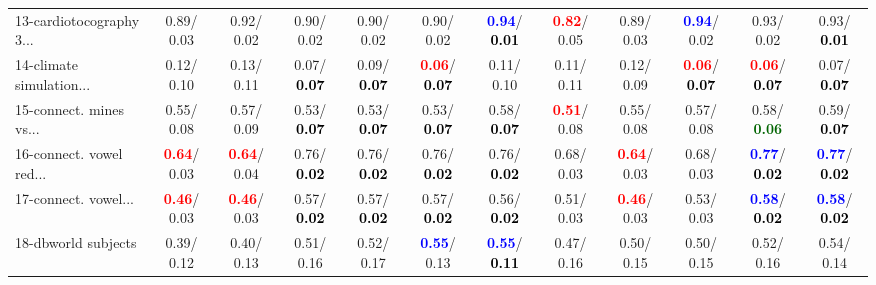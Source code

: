 \begin{table}[h]
\begin{center}
{\begin{tabular}{lc|c|c|c|c|c|c|c|c|c|c}
13-cardiotocography 3... &   0.89/  0.03 &   0.92/  0.02 &   0.90/  0.02 &   0.90/  0.02 &   0.90/  0.02 & \textcolor{blue}{\textbf{  0.94}}/\textcolor{black}{\textbf{  0.01}} & \textcolor{red}{\textbf{  0.82}}/  0.05 &   0.89/  0.03 & \textcolor{blue}{\textbf{  0.94}}/  0.02 &   0.93/  0.02 &   0.93/\textcolor{black}{\textbf{  0.01}} \\
14-climate simulation... &   0.12/  0.10 &   0.13/  0.11 &   0.07/\textcolor{black}{\textbf{  0.07}} &   0.09/\textcolor{black}{\textbf{  0.07}} & \textcolor{red}{\textbf{  0.06}}/\textcolor{black}{\textbf{  0.07}} &   0.11/  0.10 &   0.11/  0.11 &   0.12/  0.09 & \textcolor{red}{\textbf{  0.06}}/\textcolor{black}{\textbf{  0.07}} & \textcolor{red}{\textbf{  0.06}}/\textcolor{black}{\textbf{  0.07}} &   0.07/\textcolor{black}{\textbf{  0.07}} \\ \hline
15-connect. mines vs... &   0.55/  0.08 &   0.57/  0.09 &   0.53/\textcolor{black}{\textbf{  0.07}} &   0.53/\textcolor{black}{\textbf{  0.07}} &   0.53/\textcolor{black}{\textbf{  0.07}} &   0.58/\textcolor{black}{\textbf{  0.07}} & \textcolor{red}{\textbf{  0.51}}/  0.08 &   0.55/  0.08 &   0.57/  0.08 &   0.58/\textcolor{darkgreen}{\textbf{  0.06}} &   0.59/\textcolor{black}{\textbf{  0.07}} \\
16-connect. vowel red... & \textcolor{red}{\textbf{  0.64}}/  0.03 & \textcolor{red}{\textbf{  0.64}}/  0.04 &   0.76/\textcolor{black}{\textbf{  0.02}} &   0.76/\textcolor{black}{\textbf{  0.02}} &   0.76/\textcolor{black}{\textbf{  0.02}} &   0.76/\textcolor{black}{\textbf{  0.02}} &   0.68/  0.03 & \textcolor{red}{\textbf{  0.64}}/  0.03 &   0.68/  0.03 & \textcolor{blue}{\textbf{  0.77}}/\textcolor{black}{\textbf{  0.02}} & \textcolor{blue}{\textbf{  0.77}}/\textcolor{black}{\textbf{  0.02}} \\
17-connect. vowel... & \textcolor{red}{\textbf{  0.46}}/  0.03 & \textcolor{red}{\textbf{  0.46}}/  0.03 &   0.57/\textcolor{black}{\textbf{  0.02}} &   0.57/\textcolor{black}{\textbf{  0.02}} &   0.57/\textcolor{black}{\textbf{  0.02}} &   0.56/\textcolor{black}{\textbf{  0.02}} &   0.51/  0.03 & \textcolor{red}{\textbf{  0.46}}/  0.03 &   0.53/  0.03 & \textcolor{blue}{\textbf{  0.58}}/\textcolor{black}{\textbf{  0.02}} & \textcolor{blue}{\textbf{  0.58}}/\textcolor{black}{\textbf{  0.02}} \\
18-dbworld subjects &   0.39/  0.12 &   0.40/  0.13 &   0.51/  0.16 &   0.52/  0.17 & \textcolor{blue}{\textbf{  0.55}}/  0.13 & \textcolor{blue}{\textbf{  0.55}}/\textcolor{black}{\textbf{  0.11}} &   0.47/  0.16 &   0.50/  0.15 &   0.50/  0.15 &   0.52/  0.16 &   0.54/  0.14 \\

\end{tabular}}
\end{center}
\end{table}
